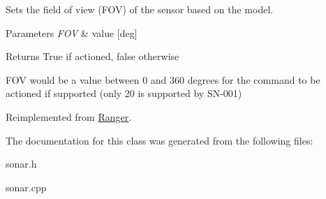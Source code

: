 Sets the field of view (F\+OV) of the sensor based on the model. 


\begin{DoxyParams}{Parameters}
{\em F\+OV} & value \mbox{[}deg\mbox{]} \\
\hline
\end{DoxyParams}
\begin{DoxyReturn}{Returns}
True if actioned, false otherwise
\end{DoxyReturn}
F\+OV would be a value between 0 and 360 degrees for the command to be actioned if supported (only 20 is supported by S\+N-\/001) 

Reimplemented from \hyperlink{classRanger_afb5d392ca450bcce295e61c121d09157}{Ranger}.



The documentation for this class was generated from the following files\+:\begin{DoxyCompactItemize}
\item 
sonar.\+h\item 
sonar.\+cpp\end{DoxyCompactItemize}
